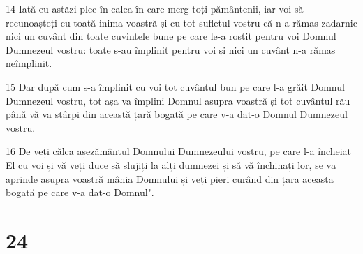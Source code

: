 \par 14 Iată eu astăzi plec în calea în care merg toți pământenii, iar voi să recunoașteți cu toată inima voastră și cu tot sufletul vostru că n-a rămas zadarnic nici un cuvânt din toate cuvintele bune pe care le-a rostit pentru voi Domnul Dumnezeul vostru: toate s-au împlinit pentru voi și nici un cuvânt n-a rămas neîmplinit.
\par 15 Dar după cum s-a împlinit cu voi tot cuvântul bun pe care l-a grăit Domnul Dumnezeul vostru, tot așa va împlini Domnul asupra voastră și tot cuvântul rău până vă va stârpi din această țară bogată pe care v-a dat-o Domnul Dumnezeul vostru.
\par 16 De veți călca așezământul Domnului Dumnezeului vostru, pe care l-a încheiat El cu voi și vă veți duce să slujiți la alți dumnezei și să vă închinați lor, se va aprinde asupra voastră mânia Domnului și veți pieri curând din țara aceasta bogată pe care v-a dat-o Domnul".

\chapter{24}

